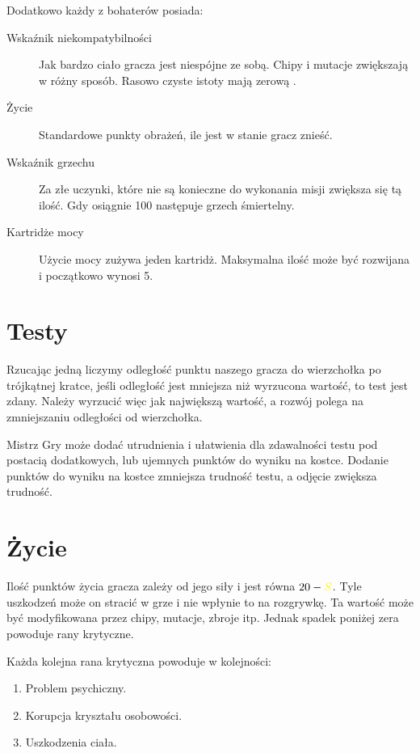 Dodatkowo każdy z bohaterów posiada:
\begin{description}
 \item [Wskaźnik niekompatybilności \abnkp{}] Jak bardzo ciało gracza jest niespójne ze sobą. Chipy i mutacje zwiększają \abnkp{} w różny sposób. Rasowo czyste istoty mają zerową \abnkp{}.
 \item [Życie \abzyc{}] Standardowe punkty obrażeń, ile jest w stanie gracz znieść.
 \item [Wskaźnik grzechu \abgrz{}] Za złe uczynki, które nie są konieczne do wykonania misji zwiększa się tą ilość. Gdy osiągnie 100 następuje grzech śmiertelny.
 \item [Kartridże mocy \abkar{}] Użycie mocy zużywa jeden kartridż. Maksymalna ilość może być rozwijana i początkowo wynosi 5.
\end{description}

\section{Testy}
Rzucając jedną \dxx{} liczymy odległość punktu naszego gracza do wierzchołka po trójkątnej kratce, jeśli odległość jest mniejsza niż wyrzucona wartość, to test jest zdany.
Należy wyrzucić więc jak największą wartość, a rozwój polega na zmniejszaniu odległości od wierzchołka.

Mistrz Gry może dodać utrudnienia i ułatwienia dla zdawalności testu pod postacią dodatkowych, lub ujemnych punktów do wyniku na kostce.
Dodanie punktów do wyniku na kostce zmniejsza trudność testu, a odjęcie zwiększa trudność.

\section{Życie}
Ilość punktów życia gracza zależy od jego siły i jest równa $20 - \abs$.
Tyle uszkodzeń może on stracić w grze i nie wpłynie to na rozgrywkę.
Ta wartość może być modyfikowana przez chipy, mutacje, zbroje itp.
Jednak spadek poniżej zera powoduje rany krytyczne.

Każda kolejna rana krytyczna powoduje w kolejności:
\begin{enumerate}
\item Problem psychiczny.
\item Korupcja kryształu osobowości.
\item Uszkodzenia ciała.
\end{enumerate}


